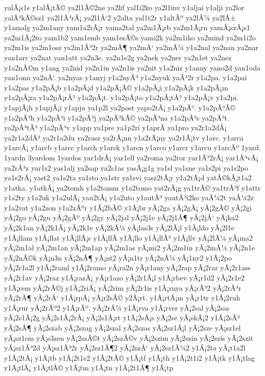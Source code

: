 {yalÃ¡s1s
y1alÃ¡tÃ©
ya2l1Ã©2ne
ya2lif
yal1i2ko
ya2l1inv
y1aljai
y1alji
ya2lor
yalÃ³kÃ©sz1
ya2l1Ã³rÃ¡
ya2l1Å‘2
y2alta
yal1t2r
y1altÃº
ya2lÃ¼
ya2lÅ±
y1amalg
ya2m1any
yam1a2rÃ¡r
yama2tal
ya2m1Ã¡rb
ya2m1Ã¡rn
yamÃ¡szÃ¡s1
ya2m1Ã¡2to
yam1b2
yam1emb
yam1esÃ©s
yami2k
ya2m1iko
ya2mind
ya2m1i2o
ya2m1is
ya2m1osz
ya2m1Ã³2r
ya2mÃ¶
ya2mÅ‘
ya2mÃ¼
y1a2nal
ya2nan
ya2nar
yan1arr
ya2nat
yan1att
ya2n3e.
ya2n1e2g
ya2nek
ya2ner
ya2n1et
ya2nez
y1a2nÃ©m
y1ang
ya2nid
ya2n1in
ya2n1is
ya2nit
y1a2niz
y1anny
yano2d
yan1oda
yan1onn
ya2nÅ‘.
ya2nyas
y1anyj
y1a2nyÃ³
y1a2nyuk
yaÃ³2r
y1a2pa.
y1a2pai
y1a2pas
y1a2pÃ¡b
y1a2pÃ¡d
y1a2pÃ¡Ã©
y1a2pÃ¡i
y1a2pÃ¡k
y1a2pÃ¡m
y1a2pÃ¡ra
y1a2pÃ¡rÃ³
y1a2pÃ¡t.
y1a2pÃ¡to
y1a2pÃ¡tÃ³
y1a2pÃ¡v
y1a2pi.
y1apjÃ¡h
y1apjÃ¡i
y1apju
ya1p2l
ya2post
yapo2tÃ¡
y1a2pÃ³.
y1a2pÃ³Ã©
y1a2pÃ³h
y1a2pÃ³i
y1a2pÃ³j
ya2pÃ³kÃ©
ya2pÃ³na
y1a2pÃ³s
ya2pÃ³t.
ya2pÃ³tÃ³
y1a2pÃ³v
y1app
ya1pre
ya1p2ri
y1aprÃ­
ya1pro
ya2r1a2dÃ¡
ya2r1a2dÃ³
ya2r1a2du
ya2rasz
ya2rÃ¡nn
y1a2rÃ¡ny
ya2r1Ã¡tv
y1arc.
y1arca
y1arcÃ¡
y1arcb
y1arcc
y1arch
y1arck
y1arcn
y1arco
y1arcr
y1arcu
y1arcÃº
1yard.
1yardn
3yardom
1yardos
yar1drÃ¡
yar1ell
ya2roma
ya2ror
yar1Ã³2rÃ¡
yar1Ã³vÃ¡
ya2rÃ³z
yar1s2
yas1alj
ya2sap
ya2s1as
yasÃ¡g1g
ya1sl
ya1sne
ya1s2pi
ya1s2po
ya1s2rÃ¡
yast2
ya1s2ta
ya1sto
ya1str
ya1svi
yasz2tÃ¡r
y1a2tÃ¡d
yatÃ©kÃ¡t1a2
y1atka.
y1atkÃ¡
ya2tomh
y1a2tomm
y1a2tomo
yat2rÃ¡g
ya1trÃ©
ya1trÃ³f
y1attr
y1a2ty
y1a2uk
y1a2ulÃ¡
yau2tÃ¡
y1a2uto
y1autÃ³
yautÃ³i2ko
yaÃ¼2t
yaÃ¼2z
y1a2vat
y1a2zon
y1a2zÃºr
y1Ã¡2bÃ©
y1Ã¡br
yÃ¡2ga
yÃ¡2gÃ¡
yÃ¡2gÃ©
yÃ¡2gi
yÃ¡2go
yÃ¡2gu
yÃ¡2gÃº
yÃ¡2gy
yÃ¡2jal
yÃ¡2j1e
yÃ¡2j1Ã¶
yÃ¡2jÅ‘
yÃ¡ka2
yÃ¡2k1an
yÃ¡2k1Ã¡
yÃ¡2k1e
yÃ¡2kÃ¼
yÃ¡las3s
yÃ¡2lÃ¡l
y1Ã¡ldo
yÃ¡2l1e
y1Ã¡llam
y1Ã¡llat
y1Ã¡llÃ¡s
y1Ã¡llÃ­
y1Ã¡llo
y1Ã¡llÃ³
y1Ã¡llv
yÃ¡2lÃ¼
yÃ¡ma2
yÃ¡2m1al
yÃ¡2m1an
yÃ¡2m1ap
yÃ¡2m1as
yÃ¡mi2
yÃ¡2m1in
yÃ¡2mÃ¼
yÃ¡2n1e
yÃ¡2nÃ©k
yÃ¡n3n
yÃ¡2nÃ¶
yÃ¡nt2
yÃ¡n1tr
yÃ¡2nÃ¼
yÃ¡1ny2
y1Ã¡2po
yÃ¡2r1a2l
y1Ã¡2raml
y1Ã¡2ramo
yÃ¡ra2n
yÃ¡r1any
yÃ¡2rap
yÃ¡2rar
yÃ¡2r1ass
yÃ¡2r1av
yÃ¡2raz
y1Ã¡razÃ¡
yÃ¡r1azo
yÃ¡2r1Ã¡l
y1Ã¡rbev
yÃ¡r1d2
yÃ¡2r1e2
y1Ã¡rem
yÃ¡2rÃ©j
y1Ã¡2riÃ¡
yÃ¡2rim
yÃ¡2r1is
y1Ã¡rnya
yÃ¡rÃ³2
yÃ¡2rÃ³r
yÃ¡2rÃ¶
yÃ¡2rÅ‘
y1Ã¡rpÃ¡
yÃ¡r2sÃ©
y2Ã¡rt.
y1Ã¡rtÃ¡m
yÃ¡r1tr
y1Ã¡2ruh
y1Ã¡rur
yÃ¡2rÃº2
y1Ã¡rÃº.
yÃ¡2rÃ¼
y1Ã¡rva
y1Ã¡rver
yÃ¡2sal
yÃ¡2sas
yÃ¡2s1Ã¡2g
yÃ¡2s1Ã¡2rÃ¡
yÃ¡2s1Ã¡rt
y1Ã¡2sÃ¡s
yÃ¡2se
yÃ¡skÃ¡2
y1Ã¡2sÃ³
yÃ¡2sÃ¶
yÃ¡2szab
yÃ¡2szag
yÃ¡2szal
yÃ¡2szas
yÃ¡2sz1Ã¡l
yÃ¡2sze
yÃ¡sz1el
yÃ¡sz1em
yÃ¡s3zen
yÃ¡2szÃ©t
yÃ¡2szÃ©v
yÃ¡2szim
yÃ¡2szin
yÃ¡2szis
yÃ¡2szit
yÃ¡sz1Ã³2d
yÃ¡sz1Ã³2r
yÃ¡2sz1Ã¶2
yÃ¡2szÅ‘
yÃ¡2sz1Ã¼2
y1Ã¡2ta
yÃ¡t1a2l
y1Ã¡2tÃ¡
y1Ã¡tb
y1Ã¡2t1e2
y1Ã¡2tÃ©
y1Ã¡tf
y1Ã¡th
y1Ã¡2t1i2
y1Ã¡tk
y1Ã¡tlag
y1Ã¡tlÃ¡
y1Ã¡tlÃ©
y1Ã¡tm
y1Ã¡tn
y1Ã¡2t1Ã¶
y1Ã¡tp
}
